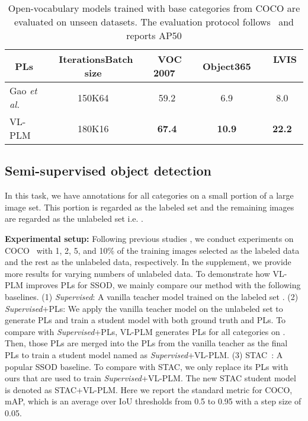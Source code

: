 \documentclass[runningheads]{llncs}
\begin{document}
\begin{table}[tb]
\begin{center}
\caption{
Open-vocabulary models trained with base categories from COCO are evaluated on unseen datasets. The evaluation protocol follows~\cite{gao2021open} and reports AP50
} \label{tab:GTest_PLs}
\begin{tabular}{l c c c c}
    \toprule
    {\ PLs} & { \ IterationsBatch size} & { \ VOC 2007\ } & { \ Object365\ } &{ \  LVIS \ } \\
    \hline
{Gao \emph{et al.} \cite{gao2021open}} & 150K64 & 59.2 & 6.9 & 8.0 \\
    {VL-PLM} & 180K16 & {\bf 67.4} & {\bf 10.9} & {\bf 22.2} \\
\bottomrule
    \end{tabular}
\end{center}
\end{table}





\subsection{Semi-supervised object detection}
\label{sec:exp_ssod}

In this task, we have annotations for all categories on a small portion of a large image set. This portion is regarded as the labeled set  and the remaining images are regarded as the unlabeled set  i.e. .


\vspace{1mm}
\noindent \textbf{Experimental setup:} 
Following previous studies \cite{sohn2020detection,xu_iccv2021_softteacher,zhou_cvpr_21}, we conduct experiments on COCO~\cite{COCO} with 1, 2, 5, and 10\% of the training images selected as the labeled data and the rest as the unlabeled data, respectively.
In the supplement, we provide more results for varying numbers of unlabeled data.
To demonstrate how VL-PLM improves PLs for SSOD, we mainly compare our method with the following baselines.
(1) \emph{Supervised}: A vanilla teacher model trained on the labeled set .
(2) \emph{Supervised}+PLs: We apply the vanilla teacher model on the unlabeled set  to generate PLs and train a student model with both ground truth and PLs.
To compare with \emph{Supervised}+PLs, VL-PLM generates PLs for all categories on . Then, those PLs are merged into the PLs from the vanilla teacher as the final PLs to train a student model named as \emph{Supervised}+VL-PLM.
(3) STAC~\cite{sohn2020detection}: A popular SSOD baseline.
To compare with STAC, we only replace its PLs with ours that are used to train \emph{Supervised}+VL-PLM. The new STAC student model is denoted as STAC+VL-PLM.
Here we report the standard metric for COCO, mAP, which is an average over IoU thresholds from 0.5 to 0.95 with a step size of 0.05.
\end{document}
